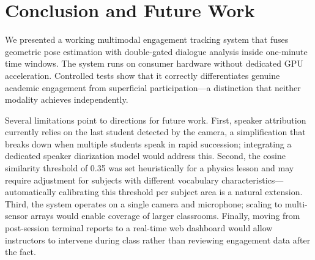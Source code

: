 \documentclass[conference]{IEEEtran}
\begin{document}
\section{Conclusion and Future Work}

We presented a working multimodal engagement tracking system that fuses geometric pose estimation with double-gated dialogue analysis inside one-minute time windows. The system runs on consumer hardware without dedicated GPU acceleration. Controlled tests show that it correctly differentiates genuine academic engagement from superficial participation---a distinction that neither modality achieves independently.

Several limitations point to directions for future work. First, speaker attribution currently relies on the last student detected by the camera, a simplification that breaks down when multiple students speak in rapid succession; integrating a dedicated speaker diarization model would address this. Second, the cosine similarity threshold of 0.35 was set heuristically for a physics lesson and may require adjustment for subjects with different vocabulary characteristics---automatically calibrating this threshold per subject area is a natural extension. Third, the system operates on a single camera and microphone; scaling to multi-sensor arrays would enable coverage of larger classrooms. Finally, moving from post-session terminal reports to a real-time web dashboard would allow instructors to intervene during class rather than reviewing engagement data after the fact.
\end{document}
